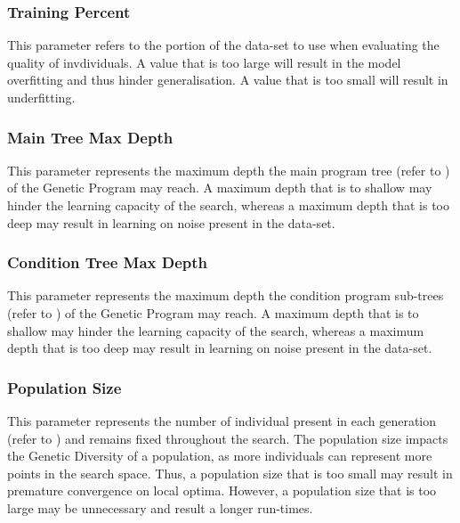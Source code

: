 \documentclass[a4paper,12pt]{article}
\begin{document}
        \subsubsection*{Training Percent} \label{subsubsec:kf}
            \par{
                \noindent
                This parameter refers to the portion of the data-set to use when evaluating the quality of invdividuals. 
                A value that is too large will result in the model overfitting and thus hinder generalisation. A value that is too small will result 
                in underfitting.
            }
        \subsubsection*{Main Tree Max Depth} \label{subsubsec:mmd}
            \par{
                \noindent 
                This parameter represents the maximum depth the main program tree (refer to ) of the Genetic Program may reach. A maximum depth that is to shallow may 
                hinder the learning capacity of the search, whereas a maximum depth that is too deep may result in learning on noise present in the data-set. 
            }
        \subsubsection*{Condition Tree Max Depth} \label{subsubsec:cmd}
            \par{
                \noindent 
                This parameter represents the maximum depth the condition program sub-trees (refer to ) of the Genetic Program may reach. A maximum depth that is to shallow may 
                hinder the learning capacity of the search, whereas a maximum depth that is too deep may result in learning on noise present in the data-set. 
            }
        \subsubsection*{Population Size} \label{subsubsec:ps}
            \par{
                \noindent
                This parameter represents the number of individual present in each generation (refer to ) and remains fixed throughout the search. The population size impacts 
                the Genetic Diversity of a population, as more individuals can represent more points in the search space. Thus, a population size that is too small may result in premature convergence on
                local optima. However, a population size that is too large may be unnecessary and result a longer run-times. 
            }
\end{document}
